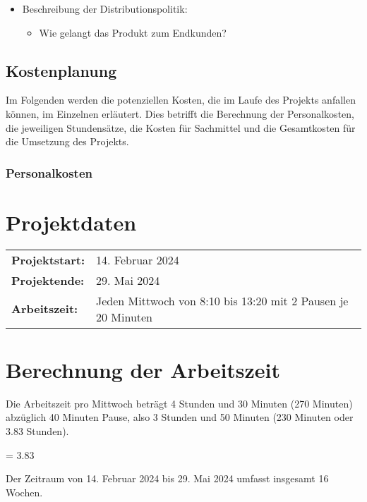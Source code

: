 \begin{itemize}
\item
  Beschreibung der Distributionspolitik:

  \begin{itemize}
  
  \item
    Wie gelangt das Produkt zum Endkunden?
  \end{itemize}
\end{itemize}

\subsection{Kostenplanung}\label{kostenplanung}

Im Folgenden werden die potenziellen Kosten, die im Laufe des Projekts anfallen können, im Einzelnen erläutert. Dies betrifft die Berechnung der Personalkosten, die jeweiligen Stundensätze, die Kosten für Sachmittel und die Gesamtkosten für die Umsetzung des Projekts.

\subsubsection{Personalkosten}\label{personalkosten}

\section*{Projektdaten}
\begin{tabular}{ll}
  \toprule
  \textbf{Projektstart:} & 14. Februar 2024 \\
  \textbf{Projektende:} & 29. Mai 2024 \\
  \textbf{Arbeitszeit:} & Jeden Mittwoch von 8:10 bis 13:20 mit 2 Pausen je 20 Minuten \\
  \bottomrule
\end{tabular}

\section*{Berechnung der Arbeitszeit}
Die Arbeitszeit pro Mittwoch beträgt 4 Stunden und 30 Minuten (270 Minuten) abzüglich 40 Minuten Pause, also 3 Stunden und 50 Minuten (230 Minuten oder 3.83 Stunden).


   = 3.83 

Der Zeitraum von 14. Februar 2024 bis 29. Mai 2024 umfasst insgesamt 16 Wochen.

